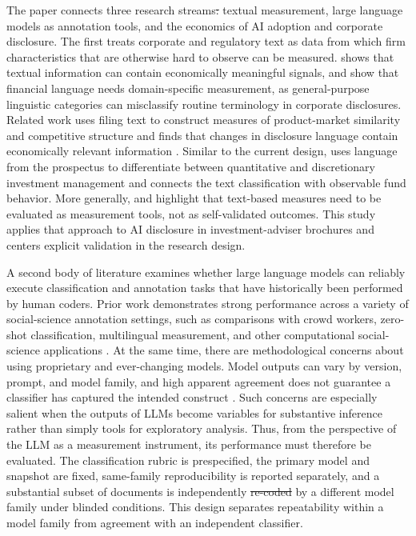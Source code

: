 \documentclass[utf8]{FrontiersinHarvard}
\makeatletter
\providecommand{\DIFaddtex}[1]{{\protect\color{blue}\uwave{#1}}} %
\providecommand{\DIFdeltex}[1]{{\protect\color{red}\sout{#1}}} %
\providecommand{\DIFaddbegin}{} %
\providecommand{\DIFaddend}{} %
\providecommand{\DIFdelbegin}{} %
\providecommand{\DIFdelend}{} %
\providecommand{\DIFadd}[1]{\texorpdfstring{\DIFaddtex{#1}}{#1}} %
\providecommand{\DIFdel}[1]{\texorpdfstring{\DIFdeltex{#1}}{}} %
\let\sout@orig\sout %
\renewcommand{\sout}[1]{\ifmmode\text{\sout@orig{\ensuremath{#1}}}\else\sout@orig{#1}\fi} %
\makeatother
\begin{document}
The paper connects three research streams\DIFdelbegin \DIFdel{: }\DIFdelend \DIFaddbegin \DIFadd{, namely }\DIFaddend textual measurement, large language models as annotation tools, and the economics of AI adoption and corporate disclosure. The first treats corporate and regulatory text as data from which firm characteristics that are otherwise hard to observe can be measured. \citet{tetlock2007} shows that textual information can contain economically meaningful signals, and \citet{loughran2011,loughran2016} show that financial language needs domain-specific measurement, as general-purpose linguistic categories can misclassify routine terminology in corporate disclosures. Related work uses filing text to construct measures of product-market similarity and competitive structure \citep{hoberg2016} and finds that changes in disclosure language contain economically relevant information \citep{cohenLazy2020}. Similar to the current design, \citet{abis2022} uses language from the prospectus to differentiate between quantitative and discretionary investment management and connects the text classification with observable fund behavior. More generally, \citet{grimmer2013} and \citet{gentzkow2019} highlight that text-based measures need to be evaluated as measurement tools, not as self-validated outcomes. This study applies that approach to AI disclosure in investment-adviser brochures and centers explicit validation in the research design.

A second body of literature examines whether large language models can reliably execute classification and annotation tasks that have historically been performed by human coders. Prior work demonstrates strong performance across a variety of social-science annotation settings, such as comparisons with crowd workers, zero-shot classification, multilingual measurement, and other computational social-science applications \citep{gilardi2023,tornberg2023,ziems2024,rathje2024}. At the same time, there are methodological concerns about using proprietary and ever-changing models. Model outputs can vary by version, prompt, and model family, and high apparent agreement does not guarantee a classifier has captured the intended construct \citep{bommasani2021,ollion2024}. Such concerns are especially salient when the outputs of LLMs become variables for substantive inference rather than simply tools for exploratory analysis. Thus, from the perspective of the LLM as a measurement instrument, its performance must therefore be evaluated. The classification rubric is prespecified, the primary model and snapshot are fixed, same-family reproducibility is reported separately, and a substantial subset of documents is independently \DIFdelbegin \DIFdel{re-coded }\DIFdelend \DIFaddbegin \DIFadd{recoded }\DIFaddend by a different model family under blinded conditions. This design separates repeatability within a model family from agreement with an independent classifier.
\end{document}
